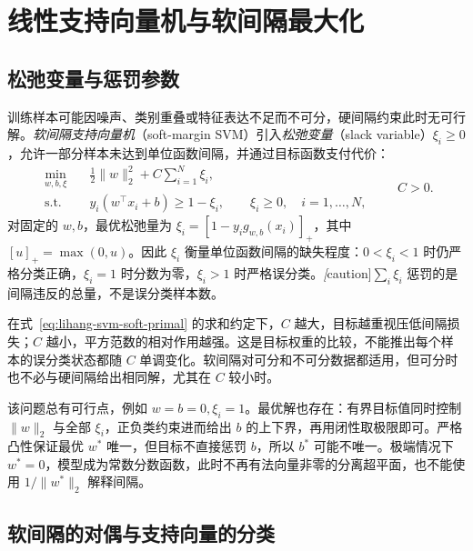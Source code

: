 \section{线性支持向量机与软间隔最大化}
\label{sec:lihang-svm-soft}

\subsection{松弛变量与惩罚参数}

训练样本可能因噪声、类别重叠或特征表达不足而不可分，硬间隔约束此时无可行解。\emph{软间隔支持向量机}（soft-margin SVM）引入\emph{松弛变量}（slack variable）$\xi_i\ge0$，允许一部分样本未达到单位函数间隔，并通过目标函数支付代价：
\begin{equation}
  \begin{aligned}
    \min_{w,b,\xi}\quad
      &\frac12\lVert w\rVert_2^2+C\sum_{i=1}^{N}\xi_i,\\
    \text{s.t.}\quad
      &y_i(w^\top x_i+b)\ge1-\xi_i,\qquad
       \xi_i\ge0,\quad i=1,\ldots,N,
  \end{aligned}
  \qquad C>0.
  \label{eq:lihang-svm-soft-primal}
\end{equation}
对固定的 $w,b$，最优松弛量为 $\xi_i=[1-y_i g_{w,b}(x_i)]_+$，其中 $[u]_+=\max(0,u)$。因此 $\xi_i$ 衡量单位函数间隔的缺失程度：$0<\xi_i<1$ 时仍严格分类正确，$\xi_i=1$ 时分数为零，$\xi_i>1$ 时严格误分类。\emph[caution]{$\sum_i\xi_i$ 惩罚的是间隔违反的总量，不是误分类样本数。}

在式~\eqref{eq:lihang-svm-soft-primal} 的求和约定下，$C$ 越大，目标越重视压低间隔损失；$C$ 越小，平方范数的相对作用越强。这是目标权重的比较，不能推出每个样本的误分类状态都随 $C$ 单调变化。软间隔对可分和不可分数据都适用，但可分时也不必与硬间隔给出相同解，尤其在 $C$ 较小时。

该问题总有可行点，例如 $w=b=0,\xi_i=1$。最优解也存在：有界目标值同时控制 $\lVert w\rVert_2$ 与全部 $\xi_i$，正负类约束进而给出 $b$ 的上下界，再用闭性取极限即可。严格凸性保证最优 $w^*$ 唯一，但目标不直接惩罚 $b$，所以 $b^*$ 可能不唯一。极端情况下 $w^*=0$，模型成为常数分数函数，此时不再有法向量非零的分离超平面，也不能使用 $1/\lVert w^*\rVert_2$ 解释间隔。

\subsection{软间隔的对偶与支持向量的分类}
\label{subsec:lihang-svm-soft-kkt}

